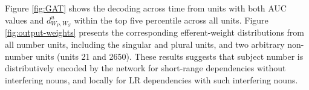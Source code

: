 Figure \ref{fig:GAT} shows the decoding across time from units with both AUC values and $d^u_{W_P, W_S}$ within the top five percentile across all units. Figure \ref{fig:output-weights} presents the corresponding efferent-weight distributions from all number units, including the singular and plural units, and two arbitrary non-number units (units \unit{2}{1} and \unit{2}{650}). These results suggests that subject number is distributively encoded by the network for short-range dependencies without interfering nouns, and locally for LR dependencies with such interfering nouns. 
